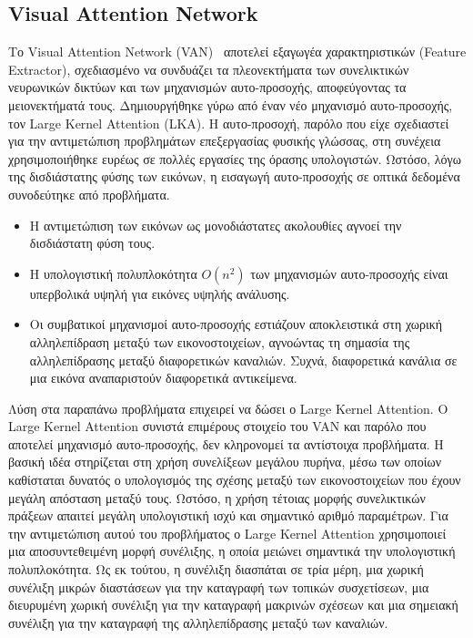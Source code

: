 \documentclass[12pt]{article}
\numberwithin{equation}{section}
\begin{document}
\subsection{Visual Attention Network}

Το Visual Attention Network (VAN)~\cite{guo2022visualattentionnetwork} αποτελεί εξαγωγέα χαρακτηριστικών (Feature Extractor), σχεδιασμένο να συνδυάζει τα πλεονεκτήματα των συνελικτικών νευρωνικών δικτύων και των μηχανισμών αυτο-προσοχής, αποφεύγοντας τα μειονεκτήματά τους. Δημιουργήθηκε γύρω από έναν νέο μηχανισμό αυτο-προσοχής, τον Large Kernel Attention (LKA). Η αυτο-προσοχή, παρόλο που είχε σχεδιαστεί για την αντιμετώπιση προβλημάτων επεξεργασίας φυσικής γλώσσας, στη συνέχεια χρησιμοποιήθηκε ευρέως σε πολλές εργασίες της όρασης υπολογιστών. Ωστόσο, λόγω της δισδιάστατης φύσης των εικόνων, η εισαγωγή αυτο-προσοχής σε οπτικά δεδομένα συνοδεύτηκε από προβλήματα.\\

\begin{itemize}
    \item Η αντιμετώπιση των εικόνων ως μονοδιάστατες ακολουθίες αγνοεί την δισδιάστατη φύση τους.
    \item Η υπολογιστική πολυπλοκότητα $O(n^2)$ των μηχανισμών αυτο-προσοχής είναι υπερβολικά υψηλή για εικόνες υψηλής ανάλυσης.
    \item Οι συμβατικοί μηχανισμοί αυτο-προσοχής εστιάζουν αποκλειστικά στη χωρική αλληλεπίδραση μεταξύ των εικονοστοιχείων, αγνοώντας τη σημασία της αλληλεπίδρασης μεταξύ διαφορετικών καναλιών. Συχνά, διαφορετικά κανάλια σε μια εικόνα αναπαριστούν διαφορετικά αντικείμενα.
\end{itemize}

Λύση στα παραπάνω προβλήματα επιχειρεί να δώσει ο Large Kernel Attention. Ο Large Kernel Attention συνιστά επιμέρους στοιχείο του VAN και παρόλο που αποτελεί μηχανισμό αυτο-προσοχής, δεν κληρονομεί τα αντίστοιχα προβλήματα. Η βασική ιδέα στηρίζεται στη χρήση συνελίξεων μεγάλου πυρήνα, μέσω των οποίων καθίσταται δυνατός ο υπολογισμός της σχέσης μεταξύ των εικονοστοιχείων που έχουν μεγάλη απόσταση μεταξύ τους. Ωστόσο, η χρήση τέτοιας μορφής συνελικτικών πράξεων απαιτεί μεγάλη υπολογιστική ισχύ και σημαντικό αριθμό παραμέτρων. Για την αντιμετώπιση αυτού του προβλήματος ο Large Kernel Attention χρησιμοποιεί μια αποσυντεθειμένη μορφή συνέλιξης, η οποία μειώνει σημαντικά την υπολογιστική πολυπλοκότητα. Ως εκ τούτου, η συνέλιξη διασπάται σε τρία μέρη, μια χωρική συνέλιξη μικρών διαστάσεων για την καταγραφή των τοπικών συσχετίσεων, μια διευρυμένη χωρική συνέλιξη για την καταγραφή μακρινών σχέσεων και μια σημειακή συνέλιξη για την καταγραφή της αλληλεπίδρασης μεταξύ των καναλιών. \\
\end{document}
